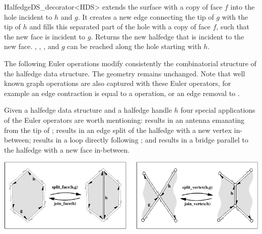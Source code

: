 \begin{ccRefClass}{HalfedgeDS_decorator<HDS>}
   {extends the surface with a copy of face $f$ into the hole
    incident to $h$ and $g$. It creates a new edge connecting the tip of
    $g$ with the tip of $h$ and fills this separated part of the hole with a
    copy of face $f$, such that the new face is incident to $g$. Returns
    the new halfedge that is incident to the new face.
    \ccPrecond {}, ,
    ,  and $g$ can be reached
    along the hole starting with $h$.}



The following Euler operations modify consistently the combinatorial
structure of the halfedge data structure. The geometry remains unchanged.
Note that well known graph operations are also captured with these
Euler operators, for example an edge contraction is equal to a
 operation, or an edge removal to .

Given a halfedge data structure  and a halfedge handle $h$
four special applications of the Euler operators are worth mentioning:
 results in an antenna emanating from the tip
of ;  results in an edge
split of the halfedge  with a new vertex in-between;
 results in a loop directly following ;
and  results in a bridge parallel to
the halfedge  with a new face in-between.

\begin{ccTexOnly}
    \begin{center}
      \parbox{\textwidth}{%
          \includegraphics[width=\textwidth]{HalfedgeDS_ref/fig/euler_hds}%
      }
    \end{center}
\end{ccTexOnly}


\end{ccRefClass}
